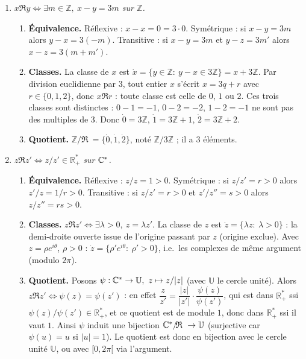 \documentclass[11pt,a4paper]{article}
\newcommand{\R}{\mathbb{R}}\newcommand{\N}{\mathbb{N}}\newcommand{\Z}{\mathbb{Z}}
\newcommand{\U}{\mathbb{U}}
\newcommand{\eqv}{\mathfrak{R}}
\begin{document}
	\begin{corrige}
		\begin{enumerate}
			\item \emph{$x\eqv y\iff\exists m\in\Z,\ x-y=3m$ sur $\Z$.}
			\begin{enumerate}
				\item \textbf{Équivalence.} Réflexive : $x-x=0=3\cdot0$. Symétrique : si $x-y=3m$ alors $y-x=3(-m)$. Transitive : si $x-y=3m$ et $y-z=3m'$ alors $x-z=3(m+m')$.
				\item \textbf{Classes.} La classe de $x$ est $\dot x=\{y\in\Z:\ y-x\in3\Z\}=x+3\Z$. Par division euclidienne par $3$, tout entier $x$ s'écrit $x=3q+r$ avec $r\in\{0,1,2\}$, donc $x\eqv r$ : toute classe est celle de $0$, $1$ ou $2$. Ces trois classes sont distinctes : $0-1=-1$, $0-2=-2$, $1-2=-1$ ne sont pas des multiples de $3$. Donc $\dot0=3\Z$, $\dot1=3\Z+1$, $\dot2=3\Z+2$.
				\item \textbf{Quotient.} $\Z/\!\eqv\ =\{\dot0,\dot1,\dot2\}$, noté $\Z/3\Z$ ; il a $3$ éléments.
			\end{enumerate}
			\item \emph{$z\eqv z'\iff z/z'\in\R_+^*$ sur $\mathbb{C}^*$.}
			\begin{enumerate}
				\item \textbf{Équivalence.} Réflexive : $z/z=1>0$. Symétrique : si $z/z'=r>0$ alors $z'/z=1/r>0$. Transitive : si $z/z'=r>0$ et $z'/z''=s>0$ alors $z/z''=rs>0$.
				\item \textbf{Classes.} $z\eqv z'\iff\exists\lambda>0,\ z=\lambda z'$. La classe de $z$ est $\dot z=\{\lambda z:\ \lambda>0\}$ : la demi-droite ouverte issue de l'origine passant par $z$ (origine exclue). Avec $z=\rho e^{i\theta}$, $\rho>0$ : $\dot z=\{\rho'e^{i\theta}:\ \rho'>0\}$, i.e.\ les complexes de même argument (modulo $2\pi$).
				\item \textbf{Quotient.} Posons $\psi:\C^*\to\U,\ z\mapsto z/|z|$ (avec $\U$ le cercle unité). Alors $z\eqv z'\iff\psi(z)=\psi(z')$ : en effet $\dfrac z{z'}=\dfrac{|z|}{|z'|}\cdot\dfrac{\psi(z)}{\psi(z')}$, qui est dans $\R_+^*$ ssi $\psi(z)/\psi(z')\in\R_+^*$, et ce quotient est de module $1$, donc dans $\R_+^*$ ssi il vaut $1$. Ainsi $\psi$ induit une bijection $\C^*/\!\eqv\ \to\U$ (surjective car $\psi(u)=u$ si $|u|=1$). Le quotient est donc en bijection avec le cercle unité $\U$, ou avec $[0,2\pi[$ via l'argument.
			\end{enumerate}
		\end{enumerate}
	\end{corrige}
	
\end{document}
